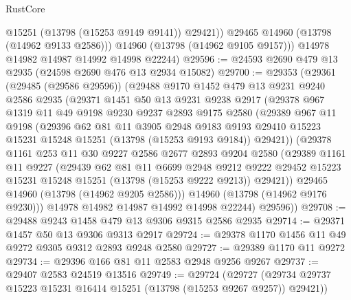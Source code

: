 \begin{lexlean}{RustCore}
\begin{coremodule}
              @15251
              (@13798 (@15253 @9149 @9141))
              @29421))
          @29465
          @14960
          (@13798 (@14962 @9133 @2586)))
        @14960
        (@13798 (@14962 @9105 @9157)))
      @14978
      @14982
      @14987
      @14992
      @14998
      @22244)
@29596 := @24593 @2690 @479 @13 @2935 (@24598 @2690 @476 @13 @2934 @15082)
@29700 := @29353
    (@29361
      (@29485 (@29586 @29596))
      (@29488
        @9170
        @1452
        @479
        @13
        @9231
        @9240
        @2586
        @2935
        (@29371
          @1451
          @50
          @13
          @9231
          @9238
          @2917
          (@29378
            @967
            @1319
            @11
            @49
            @9198
            @9230
            @9237
            @2893
            @9175
            @2580
            (@29389
              @967
              @11
              @9198
              (@29396
                @62
                @81
                @11
                @3905
                @2948
                @9183
                @9193
                @29410
                @15223
                @15231
                @15248
                @15251
                (@13798 (@15253 @9193 @9184))
                @29421))
            (@29378
              @1161
              @253
              @11
              @30
              @9227
              @2586
              @2677
              @2893
              @9204
              @2580
              (@29389
                @1161
                @11
                @9227
                (@29439
                  @62
                  @81
                  @11
                  @6699
                  @2948
                  @9212
                  @9222
                  @29452
                  @15223
                  @15231
                  @15248
                  @15251
                  (@13798 (@15253 @9222 @9213))
                  @29421))
              @29465
              @14960
              (@13798 (@14962 @9205 @2586)))
            @14960
            (@13798 (@14962 @9176 @9230)))
          @14978
          @14982
          @14987
          @14992
          @14998
          @22244)
        @29596))
@29708 := @29488 @9243 @1458 @479 @13 @9306 @9315 @2586 @2935
@29714 := @29371 @1457 @50 @13 @9306 @9313 @2917
@29724 := @29378 @1170 @1456 @11 @49 @9272 @9305 @9312 @2893 @9248 @2580
@29727 := @29389 @1170 @11 @9272
@29734 := @29396 @166 @81 @11 @2583 @2948 @9256 @9267
@29737 := @29407 @2583 @24519 @13516
@29749 := @29724
    (@29727 (@29734 @29737 @15223 @15231 @16414 @15251 (@13798 (@15253 @9267 @9257)) @29421))

\end{coremodule}
\end{lexlean}
